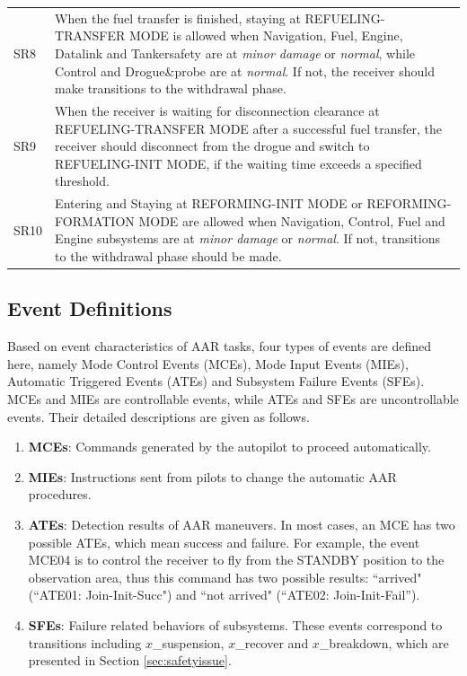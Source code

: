 \begin{table}
{\begin{tabular}{@{}lp{15cm}@{}}
			SR8 & When the fuel transfer is finished, staying at REFUELING-TRANSFER MODE is allowed when Navigation, Fuel, Engine, Datalink and Tankersafety are at \textit{minor damage} or \textit{normal}, while Control and Drogue\&probe  are at \textit{normal}. If not, the receiver should make transitions to the withdrawal phase. \\	
			SR9 & When the receiver is waiting for disconnection clearance at REFUELING-TRANSFER MODE after a successful fuel transfer, the receiver should disconnect from the drogue and switch to REFUELING-INIT MODE, if the waiting time exceeds a specified threshold. \\
			SR10 & Entering and Staying at REFORMING-INIT MODE or REFORMING-FORMATION MODE are allowed when Navigation, Control, Fuel and Engine subsystems are at \textit{minor damage} or \textit{normal}. If not, transitions to the withdrawal phase should be made. \\ 
			\hline \hline	
	\end{tabular}}
\end{table}


\subsection{Event Definitions}
Based on event characteristics of AAR tasks, four types of events are defined here, namely Mode Control Events (MCEs), Mode Input Events (MIEs), Automatic Triggered Events (ATEs) and Subsystem Failure Events (SFEs). MCEs and MIEs are controllable events, while ATEs and SFEs are uncontrollable events. Their detailed descriptions are given as follows.
\begin{enumerate}
	\item \textbf{MCEs}: Commands generated by the autopilot to proceed  automatically. 
	\item \textbf{MIEs}: Instructions sent from pilots to change the automatic AAR procedures. 
	\item \textbf{ATEs}: Detection results of AAR maneuvers. In most cases, an MCE has two possible ATEs, which mean success and failure. For example, the event MCE04 is to control the receiver to fly from the STANDBY position to the observation area, thus this command has two possible results: ``arrived" (``ATE01: Join-Init-Succ")  and ``not arrived" (``ATE02: Join-Init-Fail'').
	\item \textbf{SFEs}: Failure related behaviors of subsystems. These events correspond to transitions including $x$\_suspension, $x$\_recover and $x$\_breakdown, which are presented in Section \ref{sec:safetyissue}.
\end{enumerate}

